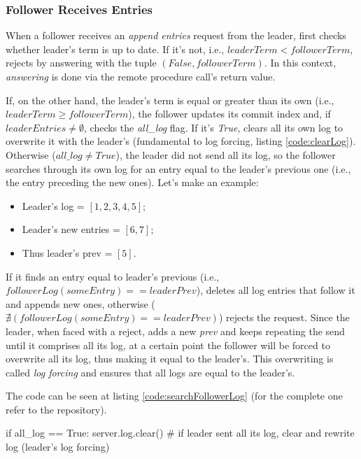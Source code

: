 \subsubsection{Follower Receives Entries}

When a follower receives an \textit{append entries} request from the leader, first checks whether leader's term is up to date. If it's not, i.e., $leaderTerm < followerTerm$, rejects by answering with the tuple $(False, followerTerm)$. In this context, \textit{answering} is done via the remote procedure call's return value.

If, on the other hand, the leader's term is equal or greater than its own (i.e., $leaderTerm \geq followerTerm$), the follower updates its commit index and, if $leaderEntries \neq \emptyset$, checks the \textit{all\_log} flag. If it's \textit{True}, clears all its own log to overwrite it with the leader's (fundamental to log forcing, listing \ref{code:clearLog}). Otherwise ($all\_log \neq True$), the leader did not send all its log, so the follower searches through its own log for an entry equal to the leader's previous one (i.e., the entry preceding the new ones). Let's make an example: 

\begin{itemize}
    \item Leader's log = $[1, 2, 3, 4, 5]$;
    \item Leader's new entries = $[6, 7]$;
    \item Thus leader's prev = $[5]$.
\end{itemize}

If it finds an entry equal to leader's previous (i.e., $followerLog(someEntry) == leaderPrev$), deletes all log entries that follow it and appends new ones, otherwise ($\nexists(followerLog(someEntry) == leaderPrev)$) rejects the request. Since the leader, when faced with a reject, adds a new \textit{prev} and keeps repeating the send until it comprises all its log, at a certain point the follower will be forced to overwrite all its log, thus making it equal to the leader's. This overwriting is called \textit{log forcing} and ensures that all logs are equal to the leader's.

The code can be seen at listing \ref{code:searchFollowerLog} (for the complete one refer to the repository).

\begin{python}[label={code:clearLog}, caption={Follower clears its own log to overwrite it with the leader's}]
if all_log == True:
    server.log.clear() # if leader sent all its log, clear and rewrite log (leader's log forcing)
\end{python}

